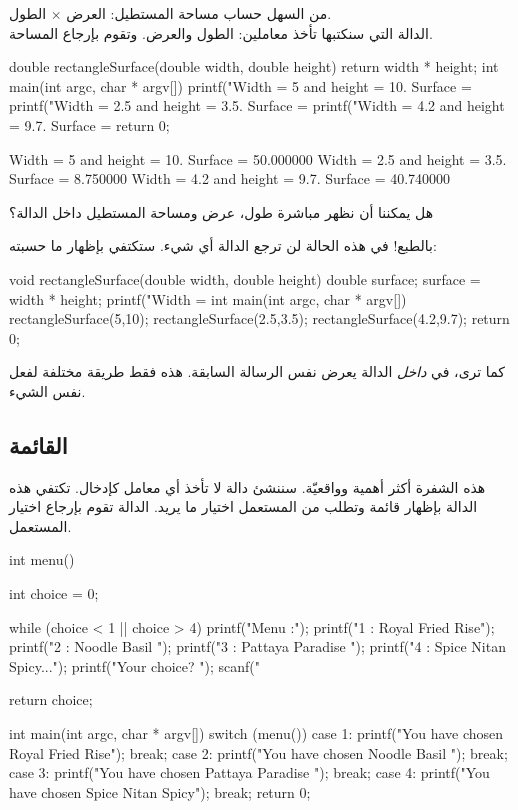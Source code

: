 من السهل حساب مساحة المستطيل: العرض $\times$ الطول.\\
الدالة التي سنكتبها
تأخذ معاملين: الطول والعرض. وتقوم بإرجاع المساحة.

\begin{Csource}
double rectangleSurface(double width, double height)
{
	return width * height;
}
int main(int argc, char * argv[])
{
	printf("Width = 5 and height = 10. Surface = %
	printf("Width = 2.5 and height = 3.5. Surface = %
	printf("Width = 4.2 and height = 9.7. Surface = %
	return 0;
}
\end{Csource}

\begin{Console}
Width = 5 and height = 10. Surface = 50.000000
Width = 2.5 and height = 3.5. Surface = 8.750000
Width = 4.2 and height = 9.7. Surface = 40.740000
\end{Console}

\begin{question}
هل يمكننا أن نظهر مباشرة طول، عرض ومساحة المستطيل داخل الدالة؟
\end{question}

بالطبع! في هذه الحالة لن ترجع الدالة أي شيء. ستكتفي بإظهار ما حسبته:

\begin{Csource}
void rectangleSurface(double width, double height)
{
	double surface;
	surface = width * height;
	printf("Width = %
}
int main(int argc, char * argv[])
{
	rectangleSurface(5,10);
	rectangleSurface(2.5,3.5);
	rectangleSurface(4.2,9.7);
	return 0;
}
\end{Csource}

كما ترى، 
في
\textit{داخل}
الدالة
يعرض نفس الرسالة السابقة. هذه فقط طريقة مختلفة لفعل نفس الشيء.

\subsection{القائمة}

هذه الشفرة أكثر أهمية وواقعيّة. سننشئ دالة 
لا تأخذ أي معامل كإدخال. تكتفي هذه الدالة بإظهار قائمة وتطلب من المستعمل اختيار ما يريد. الدالة تقوم بإرجاع اختيار المستعمل.

\begin{Csource}
int menu()
{
	int choice = 0;
	
	while (choice < 1 || choice > 4)
	{
		printf("Menu :\n");
		printf("1 : Royal Fried Rise\n");
		printf("2 : Noodle Basil \n");
		printf("3 : Pattaya Paradise \n");
		printf("4 : Spice Nitan Spicy...\n");
		printf("Your choice? ");
		scanf("%
	}   
	
	return choice;
}
int main(int argc, char * argv[])
{   
	switch (menu())
	{
		case 1:
		printf("You have chosen Royal Fried Rise\n");
		break;
		case 2:
		printf("You have chosen Noodle Basil \n");
		break;
		case 3:
		printf("You have chosen Pattaya Paradise \n");
		break;
		case 4:
		printf("You have chosen Spice Nitan Spicy\n");
		break;   
	}
	return 0;
}
\end{Csource}

